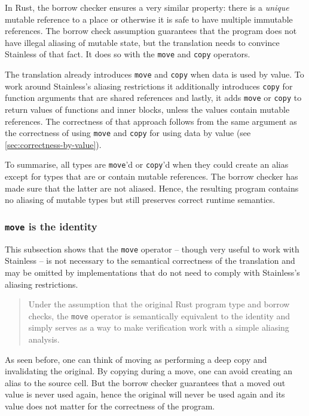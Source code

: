 In Rust, the borrow checker ensures a very similar property: there is a
\emph{unique} mutable reference to a place or otherwise it is safe to have
multiple immutable references. The borrow check assumption guarantees that the
program does not have illegal aliasing of mutable state, but the translation
needs to convince Stainless of that fact. It does so with the \lstinline!move!
and \lstinline!copy! operators.

The translation already introduces \lstinline!move! and \lstinline!copy! when
data is used by value. To work around Stainless's aliasing restrictions it
additionally introduces \lstinline!copy! for function arguments that are shared
references and lastly, it adds \lstinline!move! or \lstinline!copy! to return
values of functions and inner blocks, unless the values contain mutable
references. The correctness of that approach follows from the same argument as
the correctness of using \lstinline!move! and \lstinline!copy! for using data by
value (see \autoref{sec:correctness-by-value}).

To summarise, all types are \lstinline!move!'d or \lstinline!copy!'d when they
could create an alias except for types that are or contain mutable references.
The borrow checker has made sure that the latter are not aliased. Hence, the
resulting program contains no aliasing of mutable types but still preserves
correct runtime semantics.

\subsubsection{\texttt{move} is the identity}

This subsection shows that the \lstinline!move! operator -- though very useful
to work with Stainless -- is not necessary to the semantical correctness of the
translation and may be omitted by implementations that do not need to comply
with Stainless's aliasing restrictions.

\begin{quote}
Under the assumption that the original Rust program type and borrow checks, the
\lstinline!move! operator is semantically equivalent to the identity and simply
serves as a way to make verification work with a simple aliasing analysis.
\end{quote}

As seen before, one can think of moving as performing a deep copy and
invalidating the original. By copying during a move, one can avoid creating an
alias to the source cell. But the borrow checker guarantees that a moved out
value is never used again, hence the original will never be used again and its
value does not matter for the correctness of the program.

